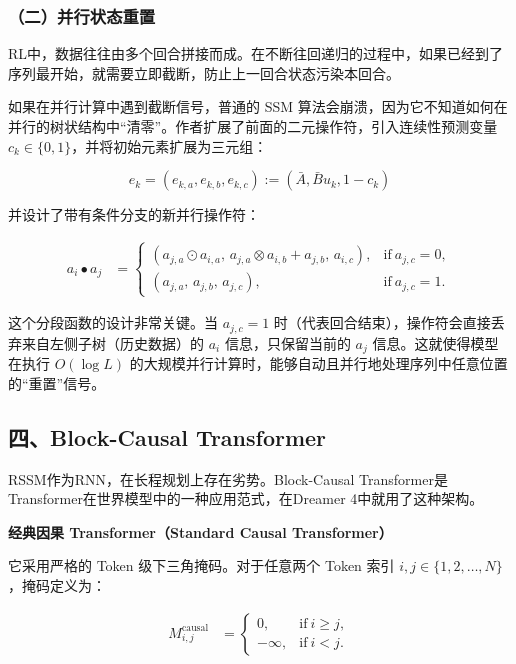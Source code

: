 \hypertarget{ux4e8cux5e76ux884cux72b6ux6001ux91cdux7f6e}{%
\subsubsection{（二）并行状态重置}\label{ux4e8cux5e76ux884cux72b6ux6001ux91cdux7f6e}}

RL中，数据往往由多个回合拼接而成。在不断往回递归的过程中，如果已经到了序列最开始，就需要立即截断，防止上一回合状态污染本回合。

如果在并行计算中遇到截断信号，普通的 SSM 算法会崩溃，因为它不知道如何在并行的树状结构中``清零''。作者扩展了前面的二元操作符，引入连续性预测变量 \(c_k \in \{0, 1\}\)，并将初始元素扩展为三元组：

\[
e_k = (e_{k,a}, e_{k,b}, e_{k,c}) := (\bar{A}, \bar{B}u_k, 1 - c_k)
\]

并设计了带有条件分支的新并行操作符：

\[
\begin{aligned}
a_i \bullet a_j
&=
\begin{cases}
(a_{j,a} \odot a_{i,a},\, a_{j,a} \otimes a_{i,b} + a_{j,b},\, a_{i,c}), & \mathrm{if}\ a_{j,c} = 0, \\
(a_{j,a},\, a_{j,b},\, a_{j,c}), & \mathrm{if}\ a_{j,c} = 1.
\end{cases}
\end{aligned}
\]

这个分段函数的设计非常关键。当 \(a_{j,c} = 1\) 时（代表回合结束），操作符会直接丢弃来自左侧子树（历史数据）的 \(a_i\) 信息，只保留当前的 \(a_j\) 信息。这就使得模型在执行 \(O(\log L)\) 的大规模并行计算时，能够自动且并行地处理序列中任意位置的``重置''信号。

\hypertarget{ux56dbblock-causal-transformer}{%
\subsection{四、Block-Causal Transformer}\label{ux56dbblock-causal-transformer}}

RSSM作为RNN，在长程规划上存在劣势。Block-Causal Transformer是Transformer在世界模型中的一种应用范式，在Dreamer 4中就用了这种架构。

\textbf{经典因果 Transformer（Standard Causal Transformer）}

它采用严格的 Token 级下三角掩码。对于任意两个 Token 索引 \(i, j \in \{1, 2, \ldots, N\}\)，掩码定义为：

\[
\begin{aligned}
M^{\mathrm{causal}}_{i,j}
&=
\begin{cases}
0, & \mathrm{if}\ i \ge j, \\
-\infty, & \mathrm{if}\ i < j.
\end{cases}
\end{aligned}
\]

